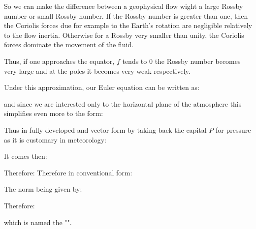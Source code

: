 	So we can make the difference between a geophysical flow wight a large Rossby number or small Rossby number. If the Rossby number is greater than one, then the Coriolis forces due for example to the Earth's rotation are negligible relatively to the flow inertia. Otherwise for a Rossby very smaller than unity, the Coriolis forces dominate the movement of the fluid.

	Thus, if one approaches the equator, $f$ tends to $0$ the Rossby number becomes very large and at the poles it becomes very weak respectively.

	Under this approximation, our Euler equation can be written as:
	
	and since we are interested only to the horizontal plane of the atmosphere this simplifies even more to the form:
	
	Thus in fully developed and vector form by taking back the capital $P$ for pressure as it is customary in meteorology:
	
	It comes then:
	
	Therefore:
	Therefore in conventional form:
	
	The norm being given by:
	
	Therefore:
	
	which is named the "".
	
